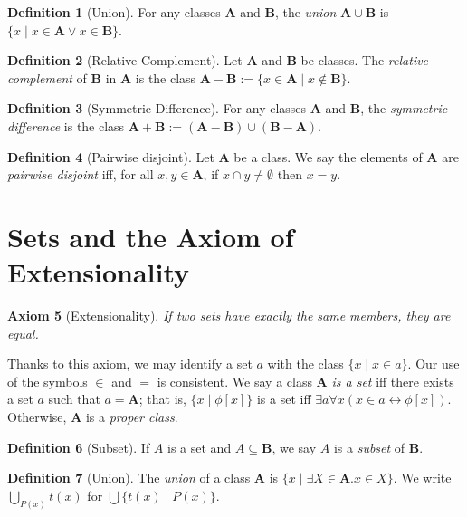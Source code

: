 \documentclass{book}
\newtheorem{ax}{Axiom}[section]
\theoremstyle{definition}
\newtheorem{df}[ax]{Definition}
\begin{document}
\begin{df}[Union]
For any classes $\mathbf{A}$ and $\mathbf{B}$, the \emph{union} $\mathbf{A} \cup \mathbf{B}$ is $\{ x \mid x \in \mathbf{A} \vee x \in \mathbf{B} \}$.
\end{df}

\begin{df}[Relative Complement]
Let $\mathbf{A}$ and $\mathbf{B}$ be classes. The \emph{relative complement} of $\mathbf{B}$ in $\mathbf{A}$ is the class $\mathbf{A} - \mathbf{B} := \{x \in \mathbf{A} \mid x \notin \mathbf{B} \}$.
\end{df}

\begin{df}[Symmetric Difference]
For any classes $\mathbf{A}$ and $\mathbf{B}$, the \emph{symmetric difference} is the class $\mathbf{A} + \mathbf{B} := (\mathbf{A} - \mathbf{B}) \cup (\mathbf{B} - \mathbf{A})$.
\end{df}

\begin{df}[Pairwise disjoint]
Let $\mathbf{A}$ be a class. We say the elements of $\mathbf{A}$ are \emph{pairwise disjoint} iff, for all $x, y \in \mathbf{A}$, if $x \cap y \neq \emptyset$ then $x = y$.
\end{df}

\section{Sets and the Axiom of Extensionality}
	
\begin{ax}[Extensionality]
If two sets have exactly the same members, they are equal.
\end{ax}

Thanks to this axiom, we may identify a set $a$ with the class $\{x \mid x \in a\}$. Our use of the symbols $\in$ and $=$ is consistent. We say a class $\mathbf{A}$ \emph{is a set} iff there exists a set $a$ such that $a = \mathbf{A}$; that is, $\{x \mid \phi[x]\}$ is a set iff $\exists a \forall x (x \in a \leftrightarrow \phi[x])$. Otherwise, $\mathbf{A}$ is a \emph{proper class}.

\begin{df}[Subset]
If $A$ is a set and $A \subseteq \mathbf{B}$, we say $A$ is a \emph{subset} of $\mathbf{B}$.
\end{df}

\begin{df}[Union]
The \emph{union} of a class $\mathbf{A}$ is $\{ x \mid \exists X \in \mathbf{A}. x \in X\}$.
We write $\bigcup_{P(x)} t(x)$ for $\bigcup \{ t(x) \mid P(x) \}$.
\end{df}
\end{document}
